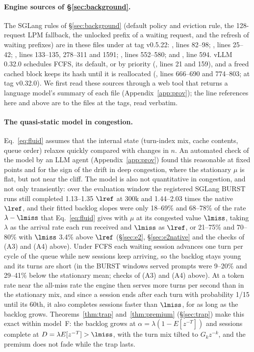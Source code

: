 \paragraph{Engine sources of \S\ref{sec:background}.} The SGLang rules of \S\ref{sec:background} (default policy and eviction rule, the 128-request LPM fallback, the unlocked prefix of a waiting request, and the refresh of waiting prefixes) are in these files under  at tag v0.5.22: , lines 82--98; , lines 25--42; , lines 133--135, 278--311 and 1591; , lines 552--580; and , line 594. vLLM 0.32.0 schedules FCFS, its default, or by priority (, lines 21 and 159), and a freed cached block keeps its hash until it is reallocated (, lines 666--690 and 774--803; at tag v0.32.0). We first read these sources through a web tool that returns a language model's summary of each file (Appendix~\ref{app:prov}); the line references here and above are to the files at the tags, read verbatim.

\paragraph{The quasi-static model in congestion.} Eq.~\eqref{eq:fluid} assumes that the internal state (turn-index mix, cache contents, queue order) relaxes quickly compared with changes in $n$. An automated check of the model by an LLM agent (Appendix~\ref{app:prov}) found this reasonable at fixed points and for the sign of the drift in deep congestion, where the stationary $\mu$ is flat, but not near the cliff. The model is also not quantitative in congestion, and not only transiently: over the evaluation window the registered SGLang BURST runs still completed 1.13--1.35 $\lref$ at 300k and 1.44--2.03 times the native $\lref$, and their fitted backlog slopes were only 18--69\% and 68--78\% of the rate $\lambda-\lmiss$ that Eq.~\eqref{eq:fluid} gives with $\mu$ at its congested value $\lmiss$, taking $\lambda$ as the arrival rate each run received and $\lmiss$ as $\lref$, or 21--75\% and 70--80\% with $\lmiss$ 3.4\% above $\lref$ (\S\ref{sec:e2}, \S\ref{sec:e2native} and the checks of (A3) and (A4) above). Under FCFS each waiting session advances one turn per cycle of the queue while new sessions keep arriving, so the backlog stays young and its turns are short (in the BURST windows served prompts were 9--20\% and 29--41\% below the stationary mean; checks of (A3) and (A4) above). At a token rate near the all-miss rate the engine then serves more turns per second than in the stationary mix, and since a session ends after each turn with probability 1/15 until its 60th, it also completes sessions faster than $\lmiss$, for as long as the backlog grows. Theorems~\ref{thm:trap} and~\ref{thm:premium} (\S\ref{sec:trap}) make this exact within model~F: the backlog grows at $\alpha=\lambda(1-E[z^{-T}])$ and sessions complete at $D=\lambda E[z^{-T}]>\lmiss$, with the turn mix tilted to $G_kz^{-k}$, and the premium does not fade while the trap lasts.

